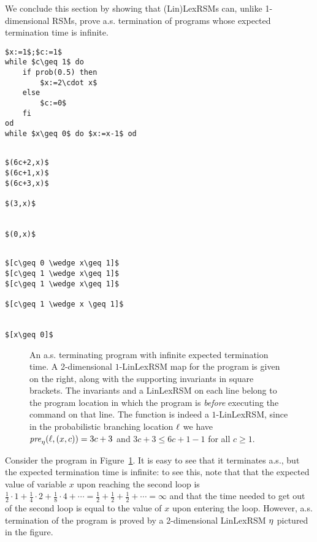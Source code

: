 We conclude this section by showing that (Lin)LexRSMs can, unlike 1-dimensional 
RSMs, prove a.s. 
termination of programs whose expected termination time is infinite.
\lstset{language=affprob}
\lstset{tabsize=2,escapechar=\&}
\newsavebox{\infas}
\begin{lrbox}{\infas}
	\begin{lstlisting}[mathescape]
$x:=1$;$c:=1$ 
while $c\geq 1$ do				
	if prob(0.5) then			
		$x:=2\cdot x$			
	else						
		$c:=0$					
	fi							
od								
while $x\geq 0$ do $x:=x-1$ od	
	\end{lstlisting}
\end{lrbox}
\newsavebox{\infast}
\begin{lrbox}{\infast}
	\begin{lstlisting}[mathescape]

$(6c+2,x)$
$(6c+1,x)$
$(6c+3,x)$

$(3,x)$


$(0,x)$	
	\end{lstlisting}
\end{lrbox}
\newsavebox{\infastinv}
\begin{lrbox}{\infastinv}
	\begin{lstlisting}[mathescape]

$[c\geq 0 \wedge x\geq 1]$
$[c\geq 1 \wedge x\geq 1]$
$[c\geq 1 \wedge x\geq 1]$

$[c\geq 1 \wedge x \geq 1]$


$[x\geq 0]$	
	\end{lstlisting}
\end{lrbox}
\begin{figure}[t]
	\centering
	\usebox{\infas}
	\hspace{0.1cm}
	\usebox{\infast}
	\hspace{0.1cm}
	\usebox{\infastinv}
\caption{An a.s. terminating program with infinite expected termination time. A 
2-dimensional $1$-LinLexRSM map for the program is given on the right, along 
with the 
supporting invariants in square brackets. The invariants and a LinLexRSM on 
each 
line belong to the program location in which the program is \emph{before} 
executing the command on that line. The function is indeed a $1$-LinLexRSM, 
since in the probabilistic branching location $\ell$ we have 
$\mathit{pre}_{\eta}(\ell,(x,c))=3c+3$ and $3c+3\leq 6c+1-1$ for all $c\geq 1$.} 
\label{fig:inftime}
\end{figure}

\begin{example}
Consider the program in Figure~\ref{fig:inftime}. It is easy to see that it 
terminates a.s., but the expected termination time is infinite: to see this, 
note that that the expected value of variable $x$ upon reaching the second loop 
is $\frac{1}{2}\cdot 1 + \frac{1}{4}\cdot 2 + \frac{1}{8}\cdot 4 + \cdots = 
\frac{1}{2}+\frac{1}{2}+\frac{1}{2}+\cdots=\infty$ and that the time needed to 
get out of the second loop is equal to the value of $x$ upon entering the loop. 
However, a.s. termination of the program is proved by a 2-dimensional LinLexRSM 
$\eta$ pictured in the figure.
\end{example}



